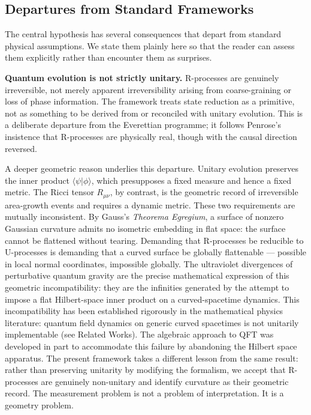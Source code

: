 \documentclass[12pt]{article}
\begin{document}
\subsection{Departures from Standard Frameworks}
\label{sec:departures}

The central hypothesis has several consequences that depart from
standard physical assumptions.
We state them plainly here so that the reader can assess them
explicitly rather than encounter them as surprises.

\medskip
\noindent\textbf{Quantum evolution is not strictly unitary.}
R-processes are genuinely irreversible, not merely apparent
irreversibility arising from coarse-graining or loss of phase
information.
The framework treats state reduction as a primitive, not as something
to be derived from or reconciled with unitary evolution.
This is a deliberate departure from the Everettian programme; it
follows Penrose's insistence that R-processes are physically real,
though with the causal direction reversed.

A deeper geometric reason underlies this departure.
Unitary evolution preserves the inner product $\langle\psi|\phi\rangle$,
which presupposes a fixed measure and hence a fixed metric.
The Ricci tensor $R_{\mu\nu}$, by contrast, is the geometric record of
irreversible area-growth events and requires a dynamic metric.
These two requirements are mutually inconsistent.
By Gauss's \emph{Theorema Egregium}, a surface of nonzero Gaussian
curvature admits no isometric embedding in flat space: the surface cannot
be flattened without tearing.
Demanding that R-processes be reducible to U-processes is demanding
that a curved surface be globally flattenable --- possible in local
normal coordinates, impossible globally.
The ultraviolet divergences of perturbative quantum gravity are the
precise mathematical expression of this geometric incompatibility:
they are the infinities generated by the attempt to impose a flat
Hilbert-space inner product on a curved-spacetime dynamics.
This incompatibility has been established rigorously in the mathematical
physics literature: quantum field dynamics on generic curved spacetimes
is not unitarily implementable (see Related Works).
The algebraic approach to QFT was developed in part to accommodate
this failure by abandoning the Hilbert space apparatus.
The present framework takes a different lesson from the same result:
rather than preserving unitarity by modifying the formalism, we accept
that R-processes are genuinely non-unitary and identify curvature as
their geometric record.
The measurement problem is not a problem of interpretation.
It is a geometry problem.
\end{document}
